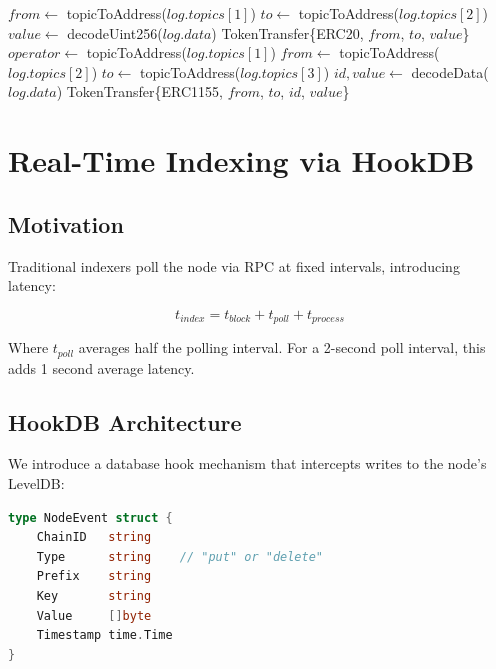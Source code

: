 \documentclass[11pt,twocolumn]{article}
\begin{document}
\begin{algorithm}
\caption{Token Transfer Detection}
\begin{algorithmic}[1]
        \State $from \gets$ topicToAddress($log.topics[1]$)
        \State $to \gets$ topicToAddress($log.topics[2]$)
        \State $value \gets$ decodeUint256($log.data$)
        \State \Return TokenTransfer\{ERC20, $from$, $to$, $value$\}
        \State $operator \gets$ topicToAddress($log.topics[1]$)
        \State $from \gets$ topicToAddress($log.topics[2]$)
        \State $to \gets$ topicToAddress($log.topics[3]$)
        \State $id, value \gets$ decodeData($log.data$)
        \State \Return TokenTransfer\{ERC1155, $from$, $to$, $id$, $value$\}
    \EndIf
\EndProcedure
\end{algorithmic}
\end{algorithm}

\section{Real-Time Indexing via HookDB}

\subsection{Motivation}

Traditional indexers poll the node via RPC at fixed intervals, introducing latency:

\begin{equation}
t_{index} = t_{block} + t_{poll} + t_{process}
\end{equation}

Where $t_{poll}$ averages half the polling interval. For a 2-second poll interval, this adds 1 second average latency.

\subsection{HookDB Architecture}

We introduce a database hook mechanism that intercepts writes to the node's LevelDB:

\begin{lstlisting}[language=Go,caption={HookDB event structure}]
type NodeEvent struct {
    ChainID   string
    Type      string    // "put" or "delete"
    Prefix    string
    Key       string
    Value     []byte
    Timestamp time.Time
}
\end{lstlisting}
\end{document}
